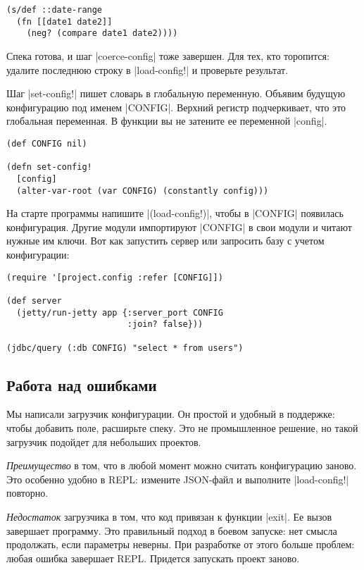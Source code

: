\begin{verbatim}
(s/def ::date-range
  (fn [[date1 date2]]
    (neg? (compare date1 date2))))
\end{verbatim}

Спека готова, и шаг \spverb|coerce-config| тоже завершен. Для тех, кто
торопится: удалите последнюю строку в \spverb|load-config!| и проверьте
результат.

Шаг \spverb|set-config!| пишет словарь в глобальную переменную. Объявим будущую
конфигурацию под именем \spverb|CONFIG|. Верхний регистр подчеркивает, что это
глобальная переменная. В функции вы не затените ее переменной \spverb|config|.

\begin{verbatim}
(def CONFIG nil)

(defn set-config!
  [config]
  (alter-var-root (var CONFIG) (constantly config)))
\end{verbatim}

На старте программы напишите \spverb|(load-config!)|, чтобы в \spverb|CONFIG|
появилась конфигурация. Другие модули импортируют \spverb|CONFIG| в свои модули
и читают нужные им ключи. Вот как запустить сервер или запросить базу с учетом
конфигурации:

\begin{verbatim}
(require '[project.config :refer [CONFIG]])

(def server
  (jetty/run-jetty app {:server_port CONFIG
                        :join? false}))

(jdbc/query (:db CONFIG) "select * from users")
\end{verbatim}

\subsection{Работа над ошибками}

Мы написали загрузчик конфигурации. Он простой и удобный в поддержке: чтобы
добавить поле, расширьте спеку. Это не промышленное решение, но такой загрузчик
подойдет для небольших проектов.

\emph{Преимущество} в том, что в любой момент можно считать конфигурацию
заново. Это особенно удобно в REPL: измените JSON-файл и выполните
\spverb|load-config!| повторно.

\emph{Недостаток} загрузчика в том, что код привязан к функции \spverb|exit|. Ее
вызов завершает программу. Это правильный подход в боевом запуске: нет смысла
продолжать, если параметры неверны. При разработке от этого больше проблем:
любая ошибка завершает REPL. Придется запускать проект заново.

